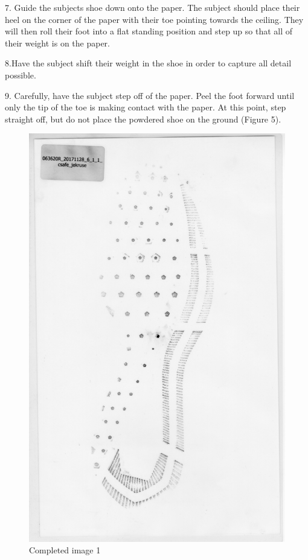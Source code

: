 7. Guide the subjects shoe down onto the paper. The subject should place their heel on the corner of the paper with their toe pointing towards the ceiling. They will then roll their foot into a flat standing position and step up so that all of their weight is on the paper. 



8.Have the subject shift their weight in the shoe in order to capture all detail possible. 

9. Carefully, have the subject step off of the paper. Peel the foot forward until only the tip of the toe is making contact with the paper. At this point, step straight off, but do not place the powdered shoe on the ground (Figure 5). 

\begin{figure}[!htp]
\centering
\includegraphics[scale=0.2]{Baseline_Paper_1}
\caption{Completed image 1}
\label{Image 5}
\end{figure}

